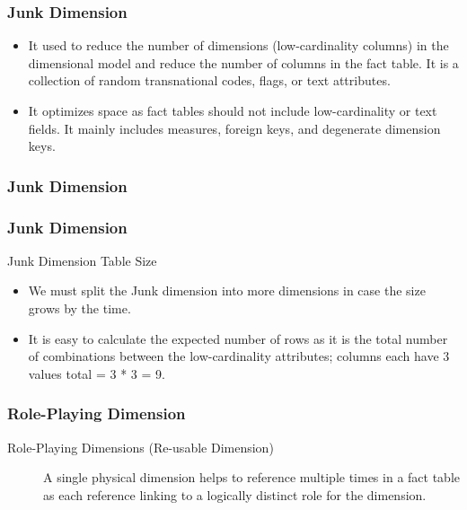 \VideoClassification[column=1, colour=blue]
\begin{frame}
    \frametitle{Junk Dimension}
    \begin{itemize}[<+->]
        \item It used to reduce the number of dimensions (low-cardinality columns) in the dimensional model and reduce the number of columns in the fact table. It is a collection of random transnational codes, flags, or text attributes.
        \item It optimizes space as fact tables should not include low-cardinality or text fields. It mainly includes measures, foreign keys, and degenerate dimension keys.
    \end{itemize}
\end{frame}
\begin{frame}
    \frametitle{Junk Dimension}
    
\end{frame}
\begin{frame}
	\frametitle{Junk Dimension}

	\begin{block}{Junk Dimension Table Size}
		\begin{itemize}
			\item We must split the Junk dimension into more dimensions in case the size grows by the time.
			\item It is easy to calculate the expected number of rows as it is the total number of combinations between the low-cardinality attributes;  columns each have 3 values total = 3 * 3 = 9.
		\end{itemize}
	\end{block}
	
\end{frame}
\VideoClassification[column=1, colour=blue]
\begin{frame}
    \frametitle{Role-Playing Dimension}
    \begin{description}
        \item [Role-Playing Dimensions (Re-usable Dimension)] A single physical dimension helps to reference multiple times in a fact table as each reference linking to a logically distinct role for the dimension.
    \end{description}
    \centering
    
\end{frame}
